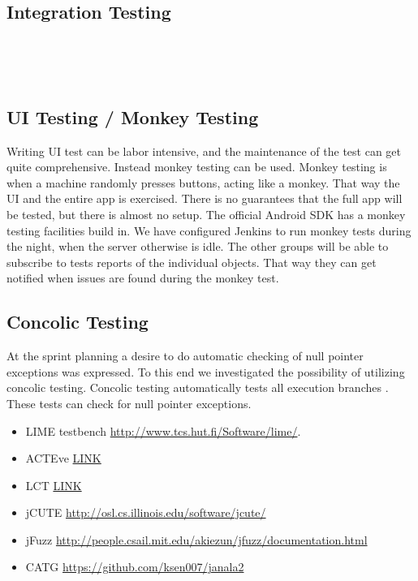 \subsection{Integration Testing}
\dummy~\dummy~\dummy

\dummy~\dummy~\dummy~
\subsection{UI Testing / Monkey Testing}
Writing UI test can be labor intensive, and the maintenance of the test can get quite comprehensive. Instead monkey testing can be used. Monkey testing is when a machine randomly presses buttons, acting like a monkey. That way the UI and the entire app is exercised. There is no guarantees that the full app will be tested, but there is almost no setup. The official Android SDK has a monkey testing facilities build in. We have configured Jenkins to run monkey tests during the night, when the server otherwise is idle. The other groups will be able to subscribe to tests reports of the individual objects. That way they can get notified when issues are found during the monkey test.
\subsection{Concolic Testing}
At the sprint planning a desire to do automatic checking of null pointer exceptions was expressed. To this end we investigated the possibility of utilizing concolic testing. Concolic testing automatically tests all execution branches \parencite{concolic_testing_2015}. These tests can check for null pointer exceptions.




\begin{itemize}
  \item LIME testbench \url{http://www.tcs.hut.fi/Software/lime/}.
  \item ACTEve \href{http://delivery.acm.org/10.1145/2400000/2393666/a59-anand.pdf?ip=130.225.198.195&id=2393666&acc=ACTIVE\%20SERVICE&key=36332CD97FA87885\%2E1DDFD8390336D738\%2E4D4702B0C3E38B35\%2E4D4702B0C3E38B35&CFID=627209490&CFTOKEN=76801213&__acm__=1424945812_ab641600a5058e5b199a617b521e4023}{LINK}
\end{itemize}


\begin{itemize}
  \item LCT \href{http://users.ics.aalto.fi/ktkahkon/KahLauSaaKauHelNie-BYTECODE2011.pdf}{LINK}
  \item jCUTE \url{http://osl.cs.illinois.edu/software/jcute/}
  \item jFuzz \url{http://people.csail.mit.edu/akiezun/jfuzz/documentation.html}
  \item CATG \url{https://github.com/ksen007/janala2}
\end{itemize}

